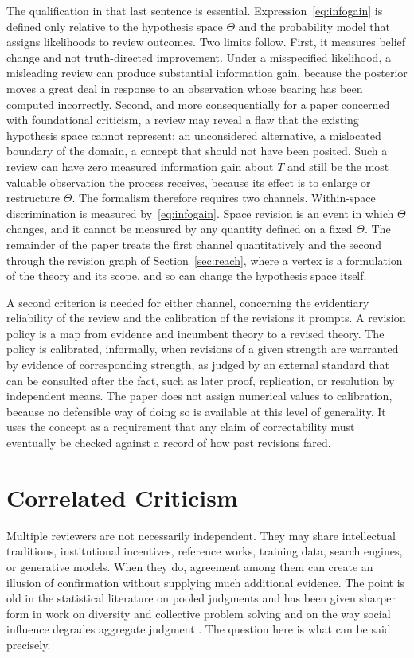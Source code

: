 \documentclass[11pt]{article}
\theoremstyle{remark}
\begin{document}
The qualification in that last sentence is essential. Expression~\eqref{eq:infogain} is defined only relative to the hypothesis space $\Theta$ and the probability model that assigns likelihoods to review outcomes. Two limits follow. First, it measures belief change and not truth-directed improvement. Under a misspecified likelihood, a misleading review can produce substantial information gain, because the posterior moves a great deal in response to an observation whose bearing has been computed incorrectly. Second, and more consequentially for a paper concerned with foundational criticism, a review may reveal a flaw that the existing hypothesis space cannot represent: an unconsidered alternative, a mislocated boundary of the domain, a concept that should not have been posited. Such a review can have zero measured information gain about $T$ and still be the most valuable observation the process receives, because its effect is to enlarge or restructure $\Theta$. The formalism therefore requires two channels. Within-space discrimination is measured by~\eqref{eq:infogain}. Space revision is an event in which $\Theta$ changes, and it cannot be measured by any quantity defined on a fixed $\Theta$. The remainder of the paper treats the first channel quantitatively and the second through the revision graph of Section~\ref{sec:reach}, where a vertex is a formulation of the theory and its scope, and so can change the hypothesis space itself.

A second criterion is needed for either channel, concerning the evidentiary reliability of the review and the calibration of the revisions it prompts. A revision policy is a map from evidence and incumbent theory to a revised theory. The policy is calibrated, informally, when revisions of a given strength are warranted by evidence of corresponding strength, as judged by an external standard that can be consulted after the fact, such as later proof, replication, or resolution by independent means. The paper does not assign numerical values to calibration, because no defensible way of doing so is available at this level of generality. It uses the concept as a requirement that any claim of correctability must eventually be checked against a record of how past revisions fared.

\section{Correlated Criticism}
\label{sec:corr}

Multiple reviewers are not necessarily independent. They may share intellectual traditions, institutional incentives, reference works, training data, search engines, or generative models. When they do, agreement among them can create an illusion of confirmation without supplying much additional evidence. The point is old in the statistical literature on pooled judgments and has been given sharper form in work on diversity and collective problem solving \cite{hongpage2004} and on the way social influence degrades aggregate judgment \cite{lorenz2011}. The question here is what can be said precisely.
\end{document}
